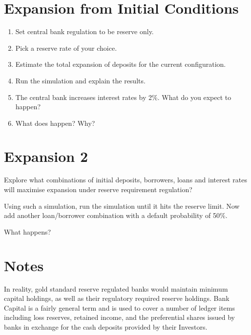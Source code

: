 \documentclass{article}
\begin{document}
\section{Expansion from Initial Conditions}
\begin{enumerate}
\item Set central bank regulation to be reserve only.
\item Pick a reserve rate of your choice.
\item Estimate the total expansion of deposits for the current configuration.
\item Run the simulation and explain the results.
\item The central bank increases interest rates by 2\%. What do you expect to happen?
\item What does happen? Why?
\end{enumerate}

\section{Expansion 2}
Explore what combinations of initial deposits, borrowers, loans and interest rates 
will maximise expansion under reserve requirement regulation?

Using such a simulation, run the simulation until it hits the reserve limit. 
Now add another loan/borrower combination with a default probability of 50\%.

What happens?
\section*{Notes}
In reality, gold standard reserve regulated banks would maintain minimum
capital holdings, as well as their regulatory required reserve holdings.
Bank Capital is a fairly general term and is used to cover a number of
ledger items including loss reserves, retained income, and the 
preferential shares issued by banks in exchange for the cash deposits 
provided by their Investors.
\end{document}
